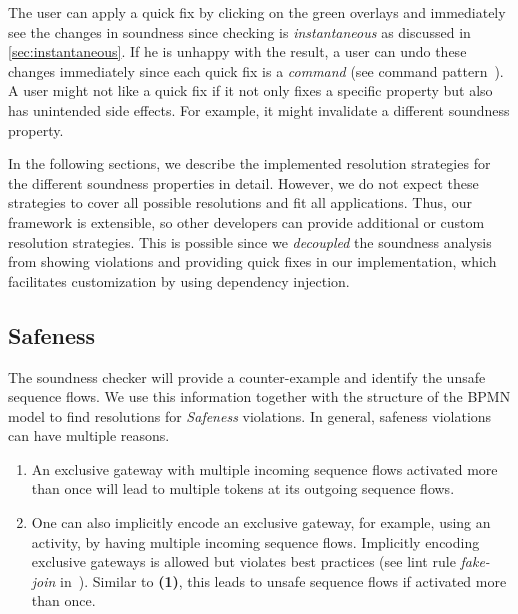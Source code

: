 \documentclass[runningheads]{llncs}
\begin{document}
The user can apply a quick fix by clicking on the green overlays and immediately see the changes in soundness since checking is \textit{instantaneous} as discussed in \autoref{sec:instantaneous}.
If he is unhappy with the result, a user can undo these changes immediately since each quick fix is a \textit{command} (see command pattern~\cite{gammaDesignPatternsElements1995}).
A user might not like a quick fix if it not only fixes a specific property but also has unintended side effects.
For example, it might invalidate a different soundness property.

In the following sections, we describe the implemented resolution strategies for the different soundness properties in detail.
However, we do not expect these strategies to cover all possible resolutions and fit all applications.
Thus, our framework is extensible, so other developers can provide additional or custom resolution strategies.
This is possible since we \textit{decoupled} the soundness analysis from showing violations and providing quick fixes in our implementation, which facilitates customization by using dependency injection.

\subsection{Safeness} \label{subsec:safeness}
The soundness checker will provide a counter-example and identify the unsafe sequence flows.
We use this information together with the structure of the BPMN model to find resolutions for \textit{Safeness} violations.
In general, safeness violations can have multiple reasons.

\begin{enumerate}
	\item An exclusive gateway with multiple incoming sequence flows activated more than once will lead to multiple tokens at its outgoing sequence flows.
	\item One can also implicitly encode an exclusive gateway, for example, using an activity, by having multiple incoming sequence flows.
	Implicitly encoding exclusive gateways is allowed but violates best practices (see lint rule \textit{fake-join} in~\cite{camundaservicesgmbhBpmnlint2024}).
	Similar to \textbf{(1)}, this leads to unsafe sequence flows if activated more than once.
\end{enumerate}
\end{document}
